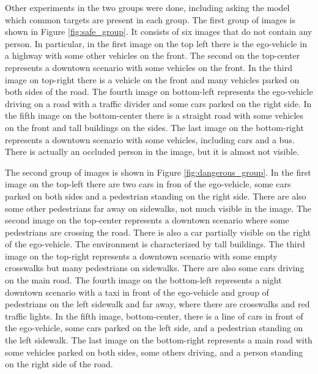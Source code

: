 Other experiments in the two groups were done, including asking the model which 
common targets are present in each group.
The first group of images is shown in Figure \ref{fig:safe_group}. It consists
of six images that do not contain any person. In particular, in the first image 
on the top left there is the ego-vehicle in a highway with some other vehicles 
on the front. The second on the top-center represents a downtown scenario with 
some vehicles on the front. In the third image on top-right there is a vehicle 
on the front and many vehicles parked on both sides of the road. The fourth 
image on bottom-left represents the ego-vehicle driving on a road with a traffic 
divider and some cars parked on the right side. In the fifth image on the 
bottom-center there is a straight road with some vehicles on the front and tall 
buildings on the sides. The last image on the bottom-right represents a 
downtown scenario with some vehicles, including cars and a bus. There is 
actually an occluded person in the image, but it is almost not visible.

The second group of images is shown in Figure \ref{fig:dangerous_group}. 
In the first image on the top-left there are two cars in fron of the ego-vehicle, 
some cars parked on both sides and a pedestrian standing on the right side. There 
are also some other pedestrians far away on sidewalks, not much visible in the 
image.
The second image on the top-center represents a downtown scenario where some 
pedestrians are crossing the road. There is also a car partially visible on the 
right of the ego-vehicle. The environment is characterized by tall buildings.
The third image on the top-right represents a downtown scenario with some 
empty crosswalks but many pedestrians on sidewalks. There are also some cars 
driving on the main road.
The fourth image on the bottom-left represents a night downtown scenario with a 
taxi in front of the ego-vehicle and group of pedestrians on the left sidewalk 
and far away, where there are crosswalks and red traffic lights.
In the fifth image, bottom-center, there is a line of cars in front of the 
ego-vehicle, some cars parked on the left side, and a pedestrian standing on the 
left sidewalk.
The last image on the bottom-right represents a main road with some vehicles 
parked on both sides, some others driving, and a person standing on the right 
side of the road.

